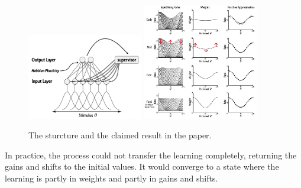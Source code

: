\documentclass[12pt, a4paper]{article}
\begin{document}
\begin{figure}[H]
    \centering
    \includegraphics[width=0.45\textwidth]{baseline_abb05/fig/abb05_struc.png}
    \includegraphics[width=0.45\textwidth]{baseline_abb05/fig/abb05_paperresult_draw.jpg}
    \\
    \caption{The sturcture and the claimed result in the paper.}
\end{figure}

In practice, the process could not transfer the learning completely, returning the gains and shifts to the initial values. It would converge to a state where the learning is partly in weights and partly in gains and shifts. 
\end{document}
